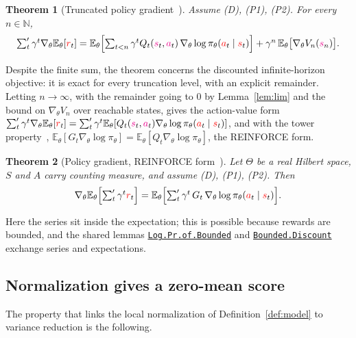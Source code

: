 \documentclass[11pt,a4paper]{article}
\newcommand{\lmod}[2]{\href{http://www.lemma.cn/lean/?module=#2}{\nolinkurl{#1}}}
\newtheorem{theorem}{Theorem}[section]
\newcommand{\N}{\mathbb{N}}
\newcommand{\E}{\mathbb{E}}
\newcommand{\rv}[1]{{\color{red}#1}}       %
\newcommand{\ra}[1]{{\color{magenta}#1}}   %
\newcommand{\sv}{\rv{s}}
\newcommand{\av}{\rv{a}}
\newcommand{\rw}{\rv{r}}
\newcommand{\grad}{\nabla_{\theta}}
\newcommand{\tsum}{\textstyle\sum'}
\begin{document}
\begin{theorem}[Truncated policy gradient~\cite{lemma_pgn}]
\label{thm:trunc}
Assume (D), (P1), (P2).
For every $n\in\N$,
\[
\tsum_t\gamma^t\grad\E_\theta[\rw_t]=\E_\theta\Bigl[\sum_{t<n}\gamma^tQ_t(\ra{s}_t,\ra{a}_t)\,\grad\log\pi_\theta(\av_t\mid\sv_t)\Bigr]+\gamma^n\,\E_\theta\bigl[\grad V_n(\ra{s}_n)\bigr].
\]
\end{theorem}
Despite the finite sum, the theorem concerns the discounted infinite-horizon objective: it is exact for every truncation level, with an explicit remainder.
Letting $n\to\infty$, with the remainder going to $0$ by Lemma~\ref{lem:lim} and the bound on $\grad V_n$ over reachable states, gives the action-value form~\cite{lemma_pgq}
$\tsum_t\gamma^t\grad\E_\theta[\rw_t]=\tsum_t\gamma^t\E_\theta[Q_t(\ra{s}_t,\ra{a}_t)\grad\log\pi_\theta(\av_t\mid\sv_t)]$, and with the tower property~\cite{lemma_tower}, $\E_\theta[G_t\grad\log\pi_\theta]=\E_\theta[Q_t\grad\log\pi_\theta]$, the REINFORCE form.

\begin{theorem}[Policy gradient, REINFORCE form~\cite{lemma_pgt}]
\label{thm:pgt}
Let $\Theta$ be a real Hilbert space, $S$ and $A$ carry counting measure, and assume (D), (P1), (P2).
Then
\[
\grad\E_\theta\Bigl[\tsum_t\gamma^t\rw_t\Bigr]=\E_\theta\Bigl[\tsum_t\gamma^t\,G_t\,\grad\log\pi_\theta(\av_t\mid\sv_t)\Bigr].
\]
\end{theorem}
Here the series sit inside the expectation; this is possible because rewards are bounded, and the shared lemmas \lmod{Log.Pr.of.Bounded}{Tensor.Eq.Expect.Sum.Grad.Log.Pr.of.Bounded} and \lmod{Bounded.Discount}{Tensor.Eq.Expect.Sum.Grad.Log.Pr.of.Bounded.Discount} exchange series and expectations.


\subsection{Normalization gives a zero-mean score}
\label{sec:zeroscore}
The property that links the local normalization of Definition~\ref{def:model} to variance reduction is the following.
\end{document}
